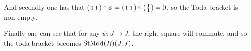 And secondly one has that \( \begin{psmallmatrix}
		1 & 1 \\
	\end{psmallmatrix} \circ \phi = \begin{psmallmatrix}
		1 & 1 \\
	\end{psmallmatrix} \circ \begin{psmallmatrix}
		1 \\ 1 \\
	\end{psmallmatrix} = 0 \), so the Toda-bracket is non-empty.

Finally one can see that for any \( \psi: J \to J \), the right square will commute, and so the toda bracket becomes \( \operatorname{StMod}(R)(J, J) \).
